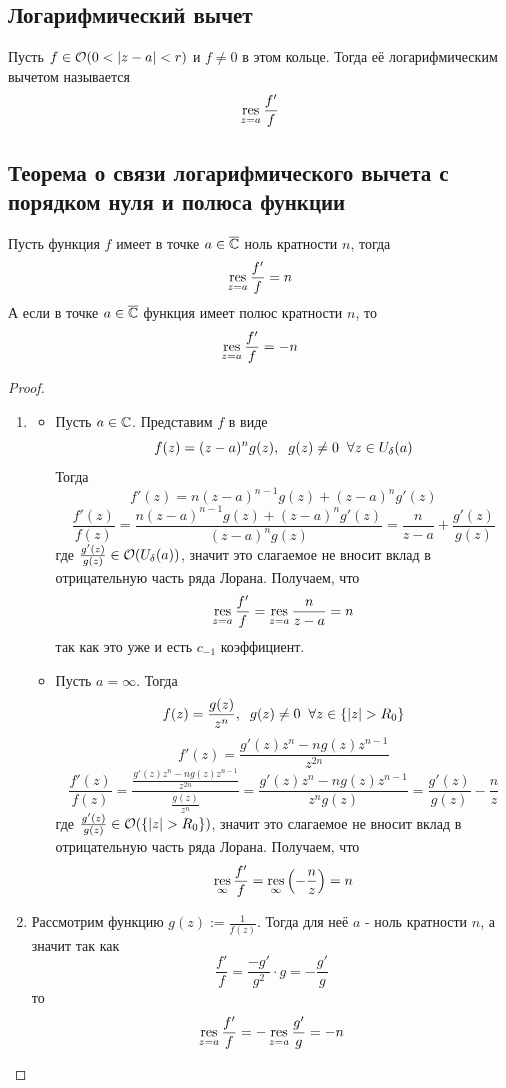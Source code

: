 \subsection{Логарифмический вычет}
\begin{definition}
  Пусть $f\in\O(0<|z-a|<r)$ и $f\neq 0$ в этом кольце. Тогда её логарифмическим вычетом называется
  \[\mathop{\rm res}\limits_{z=a}\frac{f'}{f}\]
\end{definition}
\subsection{Теорема о связи логарифмического вычета с порядком нуля и полюса функции}
\begin{theorem}
  Пусть функция $f$ имеет в точке $a\in\overline{\mathbb{C}}$ ноль кратности $n$, тогда
  \[\mathop{\rm res}\limits_{z=a}\frac{f'}{f}=n\]
  А если в точке $a\in\overline{\mathbb{C}}$ функция имеет полюс кратности $n$, то
  \[\mathop{\rm res}\limits_{z=a}\frac{f'}{f}=-n\]
\end{theorem}
\begin{proof}
  \begin{enumerate}
    \item 
    \begin{itemize}
      \item Пусть $a\in\mathbb{C}$. Представим $f$ в виде
      \[f(z)=(z-a)^ng(z),\hspace{0.2cm} g(z)\neq 0\hspace{0.2cm}\forall z\in U_\delta(a)\]
      Тогда
      \[f'(z) = n(z-a)^{n-1}g(z) + (z-a)^ng'(z)\]
      \[\frac{f'(z)}{f(z)} = \frac{n(z-a)^{n-1}g(z) + (z-a)^ng'(z)}{(z-a)^ng(z)}=\frac{n}{z-a} + \frac{g'(z)}{g(z)}\]
      где $\frac{g'(z)}{g(z)}\in\mathcal{O}(U_\delta(a))$, значит это слагаемое не вносит вклад в отрицательную часть ряда Лорана. Получаем, что
      \[\mathop{\rm res}\limits_{z=a}\frac{f'}{f} = \mathop{\rm res}\limits_{z=a}\frac{n}{z-a} = n\]
      так как это уже и есть $c_{-1}$ коэффициент.
      \item Пусть $a=\infty$. Тогда
      \[f(z) = \frac{g(z)}{z^n},\q g(z)\neq 0\q\forall z\in \left\{|z|>R_0\right\}\]
      \[f'(z) = \frac{g'(z)z^n - ng(z)z^{n-1}}{z^{2n}}\]
      \[\frac{f'(z)}{f(z)} = \frac{\frac{g'(z)z^n - ng(z)z^{n-1}}{z^{2n}}}{\frac{g(z)}{z^n}} = \frac{g'(z)z^n - ng(z)z^{n-1}}{z^ng(z)} = \frac{g'(z)}{g(z)} - \frac{n}{z}\]
      где $\frac{g'(z)}{g(z)}\in\O(\left\{|z|>R_0\right\})$, значит это слагаемое не вносит вклад в отрицательную часть ряда Лорана. Получаем, что
      \[\mathop{\rm res}\limits_{\infty}\frac{f'}{f} = \mathop{\rm res}\limits_{\infty}\left(-\frac{n}{z}\right)=n\]
    \end{itemize}
    \item Рассмотрим функцию $g(z):=\frac{1}{f(z)}$. Тогда для неё $a$ - ноль кратности $n$, а значит так как
    \[\frac{f'}{f} = \frac{-g'}{g^2}\cdot g = - \frac{g'}{g}\]
    то
    \[\mathop{\rm res}\limits_{z=a}\frac{f'}{f} = -\mathop{\rm res}\limits_{z=a}\frac{g'}{g} = -n\]
  \end{enumerate}
\end{proof}
